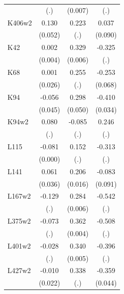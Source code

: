 \begin{table}[htbp]
\begin{tabular}{l*{3}{c}}
                &      (.)         &  (0.007)         &      (.)         \\
K406w2          &    0.130\sym{**} &    0.223         &    0.037         \\
                &  (0.052)         &      (.)         &  (0.090)         \\
K42             &    0.002         &    0.329\sym{***}&   -0.325         \\
                &  (0.004)         &  (0.006)         &      (.)         \\
K68             &    0.001         &    0.255         &   -0.253\sym{***}\\
                &  (0.026)         &      (.)         &  (0.068)         \\
K94             &   -0.056         &    0.298\sym{***}&   -0.410\sym{***}\\
                &  (0.045)         &  (0.050)         &  (0.034)         \\
K94w2           &    0.080         &   -0.085         &    0.246         \\
                &      (.)         &      (.)         &      (.)         \\
L115            &   -0.081\sym{***}&    0.152         &   -0.313         \\
                &  (0.000)         &      (.)         &      (.)         \\
L141            &    0.061\sym{*}  &    0.206\sym{***}&   -0.083         \\
                &  (0.036)         &  (0.016)         &  (0.091)         \\
L167w2          &   -0.129         &    0.284\sym{***}&   -0.542         \\
                &      (.)         &  (0.006)         &      (.)         \\
L375w2          &   -0.073         &    0.362\sym{***}&   -0.508         \\
                &      (.)         &  (0.004)         &      (.)         \\
L401w2          &   -0.028         &    0.340\sym{***}&   -0.396         \\
                &      (.)         &  (0.005)         &      (.)         \\
L427w2          &   -0.010         &    0.338         &   -0.359\sym{***}\\
                &  (0.022)         &      (.)         &  (0.044)         \\

\end{tabular}
\end{table}
